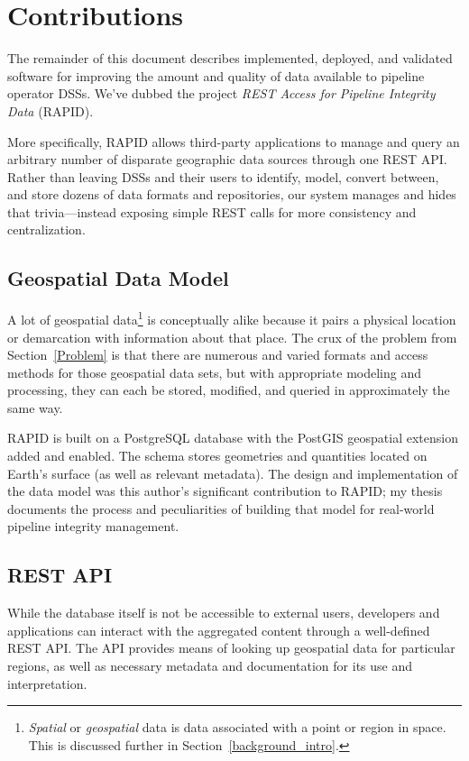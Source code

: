 \section{Contributions}
The remainder of this document describes implemented, deployed, and validated software for improving the amount and quality of data available to pipeline operator DSSs. We've dubbed the project \textit{REST Access for Pipeline Integrity Data} (RAPID).

More specifically, RAPID allows third-party applications to manage and query an arbitrary number of disparate geographic data sources through one REST API. Rather than leaving DSSs and their users to identify, model, convert between, and store dozens of data formats and repositories, our system manages and hides that trivia---instead exposing simple REST calls for more consistency and centralization.

\subsection{Geospatial Data Model}
A lot of geospatial data\footnote{\textit{Spatial} or \textit{geospatial} data is data associated with a point or region in space. This is discussed further in Section~\ref{background_intro}.} is conceptually alike because it pairs a physical location or demarcation with information about that place. The crux of the problem from Section~\ref{Problem} is that there are numerous and varied formats and access methods for those geospatial data sets, but with appropriate modeling and processing, they can each be stored, modified, and queried in approximately the same way.

RAPID is built on a PostgreSQL database with the PostGIS geospatial extension added and enabled. The schema stores geometries and quantities located on Earth's surface (as well as relevant metadata). The design and implementation of the data model was this author's significant contribution to RAPID; my thesis documents the process and peculiarities of building that model for real-world pipeline integrity management.

\subsection{REST API}
While the database itself is not be accessible to external users, developers and applications can interact with the aggregated content through a well-defined REST API. The API provides means of looking up geospatial data for particular regions, as well as necessary metadata and documentation for its use and interpretation.

